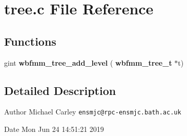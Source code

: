 \section{tree.\+c File Reference}
\label{tree_8c}
\subsection*{Functions}
\begin{DoxyCompactItemize}
\item 
gint \textbf{ wbfmm\+\_\+tree\+\_\+add\+\_\+level} (\textbf{ wbfmm\+\_\+tree\+\_\+t} $\ast$t)
\end{DoxyCompactItemize}


\subsection{Detailed Description}
\begin{DoxyAuthor}{Author}
Michael Carley {\tt ensmjc@rpc-\/ensmjc.\+bath.\+ac.\+uk} 
\end{DoxyAuthor}
\begin{DoxyDate}{Date}
Mon Jun 24 14\+:51\+:21 2019 
\end{DoxyDate}
